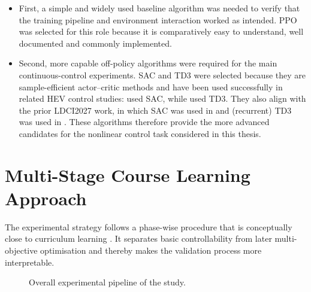 \begin{itemize}
  \item First, a simple and widely used baseline algorithm was needed to verify that the training pipeline and environment interaction worked as intended. \ac{PPO} was selected for this role because it is comparatively easy to understand, well documented and commonly implemented.
  \item Second, more capable off-policy algorithms were required for the main continuous-control experiments. \ac{SAC} and \ac{TD3} were selected because they are sample-efficient actor--critic methods and have been used successfully in related \ac{HEV} control studies: \cite{tresca_cutting-edge_2025} used \ac{SAC}, while \cite{zhou_novel_2021} used \ac{TD3}. They also align with the prior \ac{LDCI2027} work, in which \ac{SAC} was used in \cite{cuberos_munoz_developing_2025} and (recurrent) \ac{TD3} was used in \cite{universitat_politecnica_de_catalunya_development_2025}. These algorithms therefore provide the more advanced candidates for the nonlinear control task considered in this thesis.
\end{itemize}

\section{Multi-Stage Course Learning Approach}
\label{sec:method_staged}
The experimental strategy follows a phase-wise procedure that is conceptually close to curriculum learning \cite{bengio_curriculum_2009}. It separates basic controllability from later multi-objective optimisation and thereby makes the validation process more interpretable.

\begin{figure}[htbp]
  \centering
  
  \caption[Overall experimental pipeline of the study]{Overall experimental pipeline of the study.}
  \label{fig:overall_methodology}
\end{figure}

